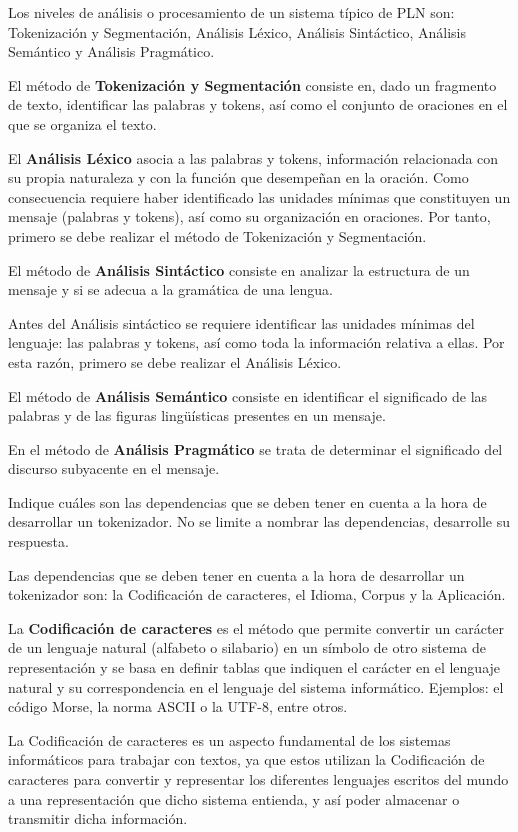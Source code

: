 \documentclass{exam}
\begin{document}
\begin{questions}
Los niveles de análisis o procesamiento de un sistema típico de PLN son: Tokenización y Segmentación, Análisis Léxico, Análisis Sintáctico, Análisis Semántico y Análisis Pragmático.

El método de {\bf Tokenización y Segmentación} consiste en, dado un fragmento de texto, identificar las palabras y tokens, así como el conjunto de oraciones en el que se organiza el texto.

El {\bf Análisis Léxico} asocia a las palabras y tokens, información relacionada con su propia naturaleza y con la función que desempeñan en la oración. Como consecuencia requiere haber identificado las unidades mínimas que constituyen un mensaje (palabras y tokens), así como su organización en oraciones. Por tanto, primero se debe realizar el método de Tokenización y Segmentación.

El método de {\bf Análisis Sintáctico} consiste en analizar la estructura de un mensaje y si se adecua a la gramática de una lengua.

Antes del Análisis sintáctico se requiere identificar las unidades mínimas del lenguaje: las palabras y tokens, así como toda la información relativa a ellas. Por esta razón, primero se debe realizar el Análisis Léxico.

El método de {\bf Análisis Semántico} consiste en identificar el significado de las palabras y de las figuras lingüísticas presentes en un mensaje.

En el método de {\bf Análisis Pragmático} se trata de determinar el significado del discurso subyacente en el mensaje.

\question Indique cuáles son las dependencias que se deben tener en cuenta a la hora de desarrollar un tokenizador. No se limite a nombrar las dependencias, desarrolle su respuesta.

Las dependencias que se deben tener en cuenta a la hora de desarrollar un tokenizador son: la Codificación de caracteres, el Idioma, Corpus y la Aplicación.

La {\bf Codificación de caracteres} es el método que permite convertir un carácter de un lenguaje natural (alfabeto o silabario) en un símbolo de otro sistema de representación y se basa en definir tablas que indiquen el carácter en el lenguaje natural y su correspondencia en el lenguaje del sistema informático. Ejemplos: el código Morse, la norma ASCII o la UTF-8, entre otros. 

La Codificación de caracteres es un aspecto fundamental de los sistemas informáticos para trabajar con textos, ya que estos utilizan la Codificación de caracteres para convertir y representar los diferentes lenguajes escritos del mundo a una representación que dicho sistema entienda, y así poder almacenar o transmitir dicha información.


\end{questions}
\end{document}
